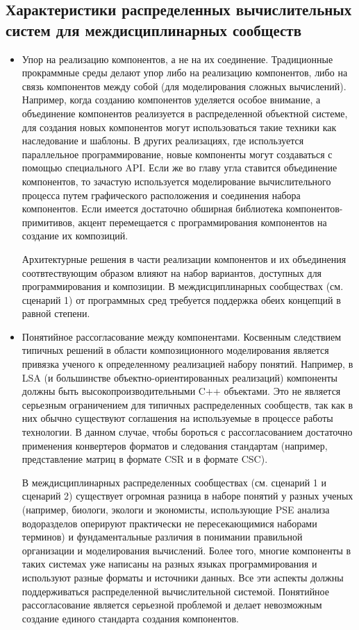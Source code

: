 \subsection{Характеристики распределенных вычислительных систем для междисциплинарных сообществ}
\label{characteristics}

\begin{itemize}
  \item Упор на реализацию компонентов, а не на их соединение. Традиционные прокраммные среды делают упор либо на реализацию компонентов, либо на связь компонентов между собой (для моделирования сложных вычислений). Например, когда созданию компонентов уделяется особое внимание, а объединение компонентов реализуется в распределенной объектной системе, для создания новых компонентов могут использоваться такие техники как наследование и шаблоны. В других реализациях, где используется параллельное программирование, новые компоненты могут создаваться с помощью специального API. Если же во главу угла ставится объединение компонентов, то зачастую используется моделирование вычислительного процесса путем графического расположения и соединения набора компонентов. Если имеется достаточно обширная библиотека компонентов-примитивов, акцент перемещается с программирования компонентов на создание их композиций.
  
Архитектурные решения в части реализации компонентов и их объединения соотвтествующим образом влияют на набор вариантов, доступных для программирования и композиции. В междисциплинарных сообществах (см. сценарий 1) от программных сред требуется поддержка обеих концепций в равной степени.     
  \item Понятийное рассогласование между компонентами. Косвенным следствием типичных решений в области композиционного моделирования является привязка ученого к определенному реализацией набору понятий. Например, в LSA (и большинстве объектно-ориентированных реализаций) компоненты должны быть высокопроизводительными C++ объектами. Это не является серьезным ограничением для типичных распределенных сообществ, так как в них обычно существуют соглашения на используемые в процессе работы технологии. В данном случае, чтобы бороться с рассогласованием достаточно применения конвертеров форматов и следования стандартам (например, представление матриц в формате CSR и в формате CSC).
  
  В междисциплинарных распределенных сообществах (см. сценарий 1 и сценарий 2) существует огромная разница в наборе понятий у разных ученых (например, биологи, экологи и экономисты, использующие PSE анализа водоразделов оперируют практически не пересекающимися наборами терминов) и фундаментальные различия в понимании правильной организации и моделирования вычислений. Более того, многие компоненты в таких системах уже написаны на разных языках программирования и используют разные форматы и источники данных. Все эти аспекты должны поддерживаться распределенной вычислительной системой. Понятийное рассогласование является серьезной проблемой и делает невозможным создание единого стандарта создания компонентов. 
  

\end{itemize}
